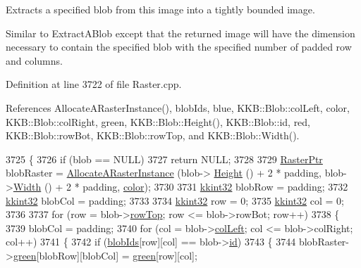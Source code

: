 Extracts a specified blob from this image into a tightly bounded image. 

Similar to \textquotesingle{}Extract\+A\+Blob\textquotesingle{} except that the returned image will have the dimension necessary to contain the specified blob with the specified number of padded row and columns. 

Definition at line 3722 of file Raster.\+cpp.



References Allocate\+A\+Raster\+Instance(), blob\+Ids, blue, K\+K\+B\+::\+Blob\+::col\+Left, color, K\+K\+B\+::\+Blob\+::col\+Right, green, K\+K\+B\+::\+Blob\+::\+Height(), K\+K\+B\+::\+Blob\+::id, red, K\+K\+B\+::\+Blob\+::row\+Bot, K\+K\+B\+::\+Blob\+::row\+Top, and K\+K\+B\+::\+Blob\+::\+Width().


\begin{DoxyCode}
3725 \{
3726   \textcolor{keywordflow}{if}  (blob == NULL)
3727     \textcolor{keywordflow}{return} NULL;
3728 
3729   \hyperlink{class_k_k_b_1_1_raster}{RasterPtr}  blobRaster = \hyperlink{class_k_k_b_1_1_raster_aa879980d112c01cb7ad9a3cfc7cd6f64}{AllocateARasterInstance} (blob->
      \hyperlink{class_k_k_b_1_1_blob_aa38a04e912ff9abf0abb950a69b65955}{Height} () + 2 * padding, blob->\hyperlink{class_k_k_b_1_1_blob_a5cc53690365e2b055c52f159de2efd1b}{Width} () + 2 * padding, \hyperlink{class_k_k_b_1_1_raster_a482384d89cc53fa4f36276307c746854}{color});
3730 
3731   \hyperlink{namespace_k_k_b_a8fa4952cc84fda1de4bec1fbdd8d5b1b}{kkint32}  blobRow = padding;
3732   \hyperlink{namespace_k_k_b_a8fa4952cc84fda1de4bec1fbdd8d5b1b}{kkint32}  blobCol = padding;
3733 
3734   \hyperlink{namespace_k_k_b_a8fa4952cc84fda1de4bec1fbdd8d5b1b}{kkint32}  row = 0;
3735   \hyperlink{namespace_k_k_b_a8fa4952cc84fda1de4bec1fbdd8d5b1b}{kkint32}  col = 0;
3736 
3737   \textcolor{keywordflow}{for}  (row = blob->\hyperlink{class_k_k_b_1_1_blob_adeb391a75a10791e7f59566eafa847ae}{rowTop};  row <= blob->rowBot;  row++)
3738   \{
3739     blobCol = padding;
3740     \textcolor{keywordflow}{for}  (col = blob->\hyperlink{class_k_k_b_1_1_blob_a1d47c1a8131e60211a3dd91910699318}{colLeft};  col <= blob->colRight;  col++)
3741     \{
3742       \textcolor{keywordflow}{if}  (\hyperlink{class_k_k_b_1_1_raster_a0fc9a1588e809db0b701f0a886bfd18c}{blobIds}[row][col] == blob->\hyperlink{class_k_k_b_1_1_blob_af752299192d447637bd6c56d4b1e0660}{id})
3743       \{
3744         blobRaster->\hyperlink{class_k_k_b_1_1_raster_a2d2238911145488e226cd2e34fc8448c}{green}[blobRow][blobCol] = \hyperlink{class_k_k_b_1_1_raster_a2d2238911145488e226cd2e34fc8448c}{green}[row][col];

\end{DoxyCode}
